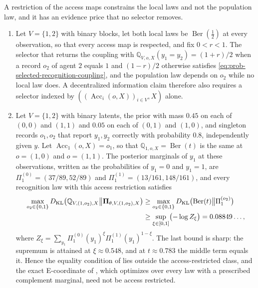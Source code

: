 A restriction of the access maps constrains the local laws and not the population law, and it has an
evidence price that no selector removes.
\begin{enumerate}
\item[(i)] Let $V=\{1,2\}$ with binary blocks, let both local laws be $\operatorname{Ber}(\tfrac12)$ at every
observation, so that every access map is respected, and fix $0<r<1$. The selector that returns the
coupling with $\mathbb Q_{V,o,X}(y_1=y_2)=(1+r)/2$ when a record $o_2$ of agent $2$ equals $1$ and
$(1-r)/2$ otherwise satisfies \eqref{eq:prob-selected-recognition-coupling}, and the population law
depends on $o_2$ while no local law does. A decentralized information claim therefore also requires a
selector indexed by $((\operatorname{Acc}_i(o,X))_{i\in V},X)$ alone.
\item[(ii)] Let $V=\{1,2\}$ with binary latents, the prior with mass $0.45$ on each of $(0,0)$ and $(1,1)$
and $0.05$ on each of $(0,1)$ and $(1,0)$, and singleton records $o_1,o_2$ that report $y_1,y_2$
correctly with probability $0.8$, independently given $y$. Let $\operatorname{Acc}_1(o,X)=o_1$, so that
$\mathbb Q_{1,o,X}=\operatorname{Ber}(t)$ is the same at $o=(1,0)$ and $o=(1,1)$. The posterior marginals
of $y_1$ at these observations, written as the probabilities of $y_1=0$ and $y_1=1$, are
$\Pi_1^{(0)}=(37/89,52/89)$ and $\Pi_1^{(1)}=(13/161,148/161)$, and
every recognition law with this access restriction satisfies
\begin{equation}
\begin{aligned}
\max_{o_2\in\{0,1\}}D_{\mathrm{KL}}\bigl(\mathbb Q_{V,(1,o_2),X}\big\Vert\boldsymbol\Pi_{\theta,V,(1,o_2),X}\bigr)
&\geq\max_{o_2\in\{0,1\}}D_{\mathrm{KL}}\bigl(\operatorname{Ber}(t)\big\Vert\Pi_1^{(o_2)}\bigr)\\
&\geq\sup_{\xi\in[0,1]}\bigl(-\log Z_\xi\bigr)=0.08849\ldots,
\end{aligned}
\label{eq:prob-access-gap-floor}
\end{equation}
where $Z_\xi=\sum_{y_1}\Pi_1^{(0)}(y_1)^\xi\Pi_1^{(1)}(y_1)^{1-\xi}$. The last bound is sharp: the supremum
is attained at $\xi\approx0.548$, and at $t\approx0.783$ the middle term equals it. Hence the equality
condition of  lies outside the access-restricted class, and the exact
E-coordinate of , which optimizes over every law with a prescribed
complement marginal, need not be access restricted.
\end{enumerate}

